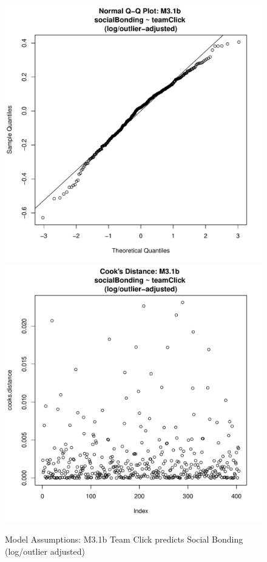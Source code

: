 \documentclass[12pt]{report}
\begin{document}
{\begin{figure}[htbp]
  \includegraphics[scale =.4]{../images/MLM31bOutLogQQNorm.pdf}
  \includegraphics[scale =.4]{../images/MLM31bOutLogCooksD.pdf}
  \caption{Model Assumptions: M3.1b Team Click predicts Social Bonding (log/outlier adjusted)}
  \label{fig:MLM31bLogOutAssumptions}
\end{figure}






}
\end{document}
